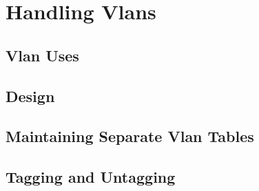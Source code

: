 \chapter{Handling Vlans}

\section{Vlan Uses}
 \label{handling_vlans:uses}

\section{Design}

\section{Maintaining Separate Vlan Tables}

\section{Tagging and Untagging}
